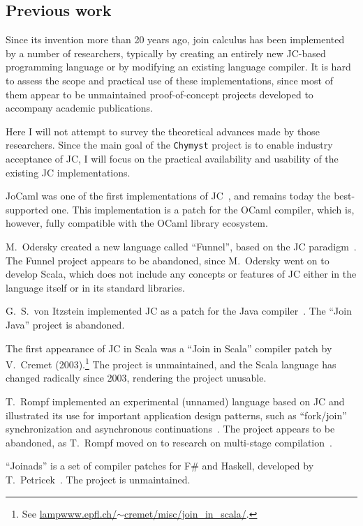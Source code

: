 \documentclass[sigplan,10pt,review,anonymous]{acmart}\settopmatter{printfolios=true}
\begin{document}
\subsection{Previous work}

Since its invention more than 20 years ago, join calculus has been
implemented by a number of researchers, typically by creating an entirely
new JC-based programming language or by modifying an existing language
compiler. It is hard to assess the scope and practical use of these
implementations, since most of them appear to be unmaintained proof-of-concept
projects developed to accompany academic publications. 

Here I will not attempt to survey the theoretical advances made by
those researchers. Since the main goal of the \texttt{Chymyst} project
is to enable industry acceptance of JC, I will focus on the practical
availability and usability of the existing JC implementations.

JoCaml was one of the first implementations of JC~\citep{FouEA2003},
and remains today the best-supported one. This implementation is a
patch for the OCaml compiler, which is, however, fully compatible
with the OCaml library ecosystem. 

M.~Odersky created a new language called ``Funnel'', based on the
JC paradigm~\citep{Ode2000}. The Funnel project appears to be abandoned,
since M.~Odersky went on to develop Scala, which does not include
any concepts or features of JC \textemdash{} either in the language
itself or in its standard libraries.

G.~S.~von Itzstein implemented JC as a patch for the Java compiler~\citep{Von2004}.
The ``Join Java'' project is abandoned.

The first appearance of JC in Scala was a \textquotedblleft Join in
Scala\textquotedblright{} compiler patch by V.~Cremet (2003).\footnote{ See \href{http://lampwww.epfl.ch/~cremet/misc/join_in_scala/index.html}{lampwww.epfl.ch/$\sim$cremet/misc/join\_{}in\_{}scala/}.}
The project is unmaintained, and the Scala language has changed radically
since 2003, rendering the project unusable.

T.~Rompf implemented an experimental (unnamed) language based on
JC and illustrated its use for important application design patterns,
such as ``fork/join'' synchronization and asynchronous continuations~\citep{Rom2007}.
The project appears to be abandoned, as T.~Rompf moved on to research
on multi-stage compilation~\citep{Rom2012}.

``Joinads'' is a set of compiler patches for F\# and Haskell, developed
by T.~Petricek~\citep{PetSym2011}. The project is unmaintained.
\end{document}
